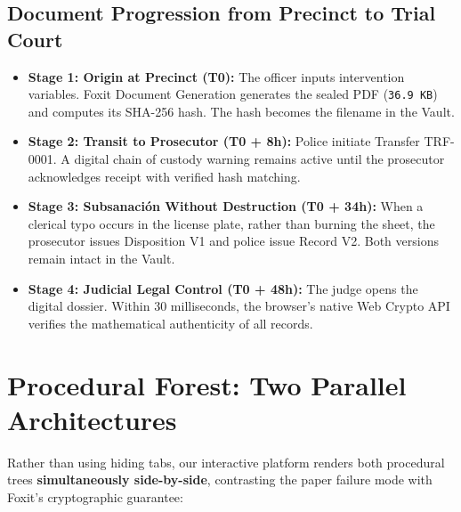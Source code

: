 \documentclass[11pt,a4paper]{article}
\begin{document}
\vspace{6pt}

\subsection{Document Progression from Precinct to Trial Court}
\begin{itemize}[leftmargin=1.5em,itemsep=3pt]
    \item \textbf{Stage 1: Origin at Precinct (T0):} The officer inputs intervention variables. Foxit Document Generation generates the sealed PDF (\texttt{36.9 KB}) and computes its SHA-256 hash. The hash becomes the filename in the Vault.
    \item \textbf{Stage 2: Transit to Prosecutor (T0 + 8h):} Police initiate Transfer TRF-0001. A digital chain of custody warning remains active until the prosecutor acknowledges receipt with verified hash matching.
    \item \textbf{Stage 3: Subsanación Without Destruction (T0 + 34h):} When a clerical typo occurs in the license plate, rather than burning the sheet, the prosecutor issues Disposition V1 and police issue Record V2. Both versions remain intact in the Vault.
    \item \textbf{Stage 4: Judicial Legal Control (T0 + 48h):} The judge opens the digital dossier. Within 30 milliseconds, the browser's native Web Crypto API verifies the mathematical authenticity of all records.
\end{itemize}

\newpage
\section{Procedural Forest: Two Parallel Architectures}

Rather than using hiding tabs, our interactive platform renders both procedural trees \textbf{simultaneously side-by-side}, contrasting the paper failure mode with Foxit's cryptographic guarantee:
\end{document}
